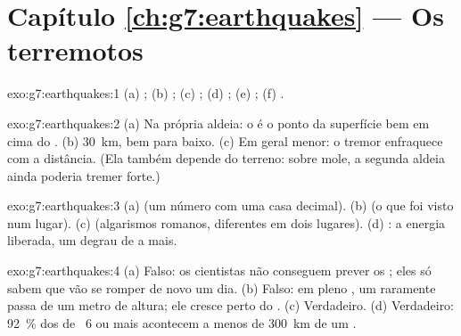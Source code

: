 \section*{Capítulo \ref{ch:g7:earthquakes} --- Os terremotos}

\begin{solution}{exo:g7:earthquakes:1}
(a) ; (b) ; (c) ; (d) ; (e) ;
(f) .
\end{solution}

\begin{solution}{exo:g7:earthquakes:2}
(a) Na própria aldeia: o  é o ponto da superfície bem em cima do
. (b) \qty{30}{km}, bem para baixo. (c) Em geral menor: o tremor
enfraquece com a distância. (Ela também depende do terreno: sobre 
mole, a segunda aldeia ainda poderia tremer forte.)
\end{solution}

\begin{solution}{exo:g7:earthquakes:3}
(a)  (um número com uma casa decimal). (b)  (o que
foi visto num lugar). (c)  (algarismos romanos, diferentes em
dois lugares). (d) : a energia liberada, um degrau de 
a mais.
\end{solution}

\begin{solution}{exo:g7:earthquakes:4}
(a) Falso: os cientistas não conseguem prever os ; eles só
sabem que  vão se romper de novo um dia. (b) Falso: em pleno
, um  raramente passa de um metro de altura; ele cresce
perto do . (c) Verdadeiro. (d) Verdadeiro: 92~\% dos  de
~6 ou mais acontecem a menos de \qty{300}{km} de um .
\end{solution}

